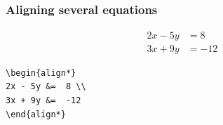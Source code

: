 \documentclass[12pt]{beamer}
\begin{document}
\begin{frame}[fragile]
\section{         }
\frametitle{ Aligning several equations }


\begin{align*} 
2x - 5y &=  8 \\ 
3x + 9y &=  -12
\end{align*}



\begin{verbatim}
\begin{align*} 
2x - 5y &=  8 \\ 
3x + 9y &=  -12
\end{align*}

\end{verbatim}

\end{frame}
\end{document}
